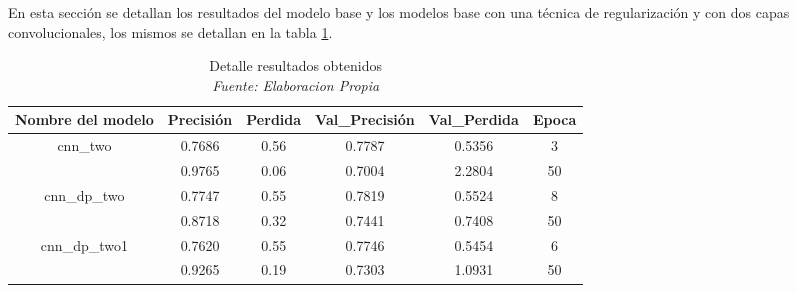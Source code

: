En esta sección se detallan los resultados del modelo base y  los modelos  base con una técnica de regularización y con dos capas convolucionales, los mismos se detallan en  la tabla \ref{tbl:12}.

\begin{table}[!ht]
	\centering
	\begin{tabular}{|c|c|c|c|c|c|}
		\hline
		\textbf{Nombre del modelo} & \textbf{Precisión} & \textbf{Perdida} & \textbf{Val\_Precisión} & \textbf{Val\_Perdida} & \textbf{Epoca} \\ \hline
		cnn\_two & 0.7686 & 0.56 & 0.7787 & 0.5356 & 3 \\ \cline{2-6}
		~ & 0.9765 & 0.06 & 0.7004 & 2.2804 & 50 \\ \hline
		cnn\_dp\_two & 0.7747 & 0.55 & 0.7819 & 0.5524 & 8 \\ \cline{2-6}
		~ & 0.8718 & 0.32 & 0.7441 & 0.7408 & 50 \\ \hline
		cnn\_dp\_two1 & 0.7620 & 0.55 & 0.7746 & 0.5454 & 6 \\ \cline{2-6}
		~ & 0.9265 & 0.19 & 0.7303 & 1.0931 & 50 \\ \hline
	\end{tabular}
	\caption[Detalle resultados obtenidos]{Detalle resultados obtenidos
		\\\textit{Fuente: Elaboracion Propia}}
	\label{tbl:12}
\end{table}



